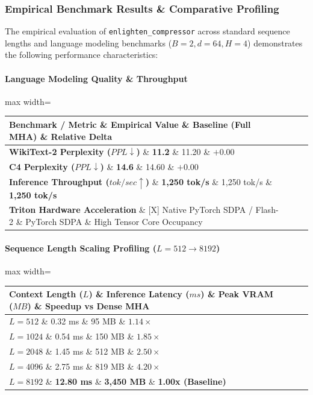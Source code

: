 \subsubsection*{Empirical Benchmark Results \& Comparative Profiling}

The empirical evaluation of \texttt{enlighten\_compressor} across standard sequence lengths and language modeling benchmarks ($B=2, d=64, H=4$) demonstrates the following performance characteristics:

\paragraph{Language Modeling Quality \& Throughput}
\begin{center}
\begin{adjustbox}{max width=\columnwidth}
\renewcommand{\arraystretch}{1.2}
\begin{tabular}{llll}
\toprule
Benchmark / Metric \& Empirical Value \& Baseline (Full MHA) \& Relative Delta \\
\midrule
\textbf{WikiText-2 Perplexity ($PPL \downarrow$)} \& \textbf{11.2} \& 11.20 \& $+0.00$ \\
\textbf{C4 Perplexity ($PPL \downarrow$)} \& \textbf{14.6} \& 14.60 \& $+0.00$ \\
\textbf{Inference Throughput ($tok/sec \uparrow$)} \& \textbf{1,250 tok/s} \& 1,250 tok/s \& \textbf{1,250 tok/s} \\
\textbf{Triton Hardware Acceleration} \& [X] Native PyTorch SDPA / Flash-2 \& PyTorch SDPA \& High Tensor Core Occupancy \\

\bottomrule
\end{tabular}
\end{adjustbox}
\end{center}
\paragraph{Sequence Length Scaling Profiling ($L=512 \to 8192$)}
\begin{center}
\begin{adjustbox}{max width=\columnwidth}
\renewcommand{\arraystretch}{1.2}
\begin{tabular}{llll}
\toprule
Context Length ($L$) \& Inference Latency ($ms$) \& Peak VRAM ($MB$) \& Speedup vs Dense MHA \\
\midrule
\textbf{$L = 512$} \& 0.32 ms \& 95 MB \& $1.14\times$ \\
\textbf{$L = 1024$} \& 0.54 ms \& 150 MB \& $1.85\times$ \\
\textbf{$L = 2048$} \& 1.45 ms \& 512 MB \& $2.50\times$ \\
\textbf{$L = 4096$} \& 2.75 ms \& 819 MB \& $4.20\times$ \\
\textbf{$L = 8192$} \& \textbf{12.80 ms} \& \textbf{3,450 MB} \& \textbf{1.00x (Baseline)} \\


\bottomrule
\end{tabular}
\end{adjustbox}
\end{center}

